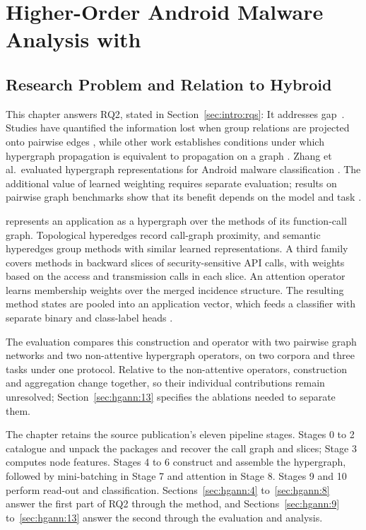 \chapter{Higher-Order Android Malware Analysis with \hgann{}}
\label{chap:hgann}

\section{Research Problem and Relation to Hybroid}
\label{sec:hgann:1}

This chapter answers RQ2, stated in Section~\ref{sec:intro:rqs}: \rqTwoText{} It addresses
gap~. Studies have quantified the information lost when group relations are projected
onto pairwise edges \cite{kang2024low, wang2024graphs}, while other work establishes conditions
under which hypergraph propagation is equivalent to propagation on a graph
\cite{agarwal2006higherorder, chitra2019randomwalks}. Zhang et al.\ evaluated hypergraph
representations for Android malware classification \cite{zhang2023android}. The additional
value of learned weighting requires separate evaluation; results on pairwise graph benchmarks
show that its benefit depends on the model and task \cite{fang2025kaa}.

\hgann{} represents an application as a hypergraph over the methods of its function-call graph.
Topological hyperedges record call-graph proximity, and semantic hyperedges group methods with
similar learned representations. A third family covers methods in backward slices of
security-sensitive API calls, with weights based on the access and transmission calls in each
slice. An attention operator learns membership weights over the merged incidence structure.
The resulting method states are pooled into an application vector, which feeds a classifier
with separate binary and class-label heads \cite{norouzian2025hgannmal}.

The evaluation compares this construction and operator with two pairwise graph networks and
two non-attentive hypergraph operators, on two corpora and three tasks under one protocol.
Relative to the non-attentive operators, construction and aggregation change together, so
their individual contributions remain unresolved; Section~\ref{sec:hgann:13} specifies the
ablations needed to separate them.

The chapter retains the source publication's eleven pipeline stages. Stages 0 to 2 catalogue
and unpack the packages and recover the call graph and slices; Stage 3 computes node features.
Stages 4 to 6 construct and assemble the hypergraph, followed by mini-batching in Stage 7 and
attention in Stage 8. Stages 9 and 10 perform read-out and classification.
Sections~\ref{sec:hgann:4} to~\ref{sec:hgann:8} answer the first part of RQ2 through the
method, and Sections~\ref{sec:hgann:9} to~\ref{sec:hgann:13} answer the second through the
evaluation and analysis.

